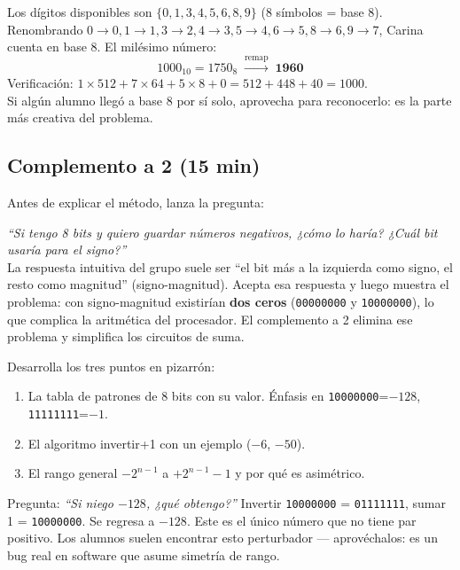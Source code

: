 \documentclass[12pt, oneside]{article}
\begin{document}
\begin{notaprofesor}
  Los dígitos disponibles son $\{0,1,3,4,5,6,8,9\}$ (8 símbolos = base 8).
  Renombrando $0\to0, 1\to1, 3\to2, 4\to3, 5\to4, 6\to5, 8\to6, 9\to7$,
  Carina cuenta en base 8. El milésimo número:
  \[
    1000_{10} = 1750_8 \;\xrightarrow{\text{remap}}\; \mathbf{1960}
  \]
  Verificación: $1\times512 + 7\times64 + 5\times8 + 0 = 512+448+40 = 1000$. \checkmark\\[4pt]
  Si algún alumno llegó a base 8 por sí solo, aprovecha para reconocerlo:
  es la parte más creativa del problema.
\end{notaprofesor}

\subsection{Complemento a 2 (15 min)}

Antes de explicar el método, lanza la pregunta:

\begin{notaprofesor}
  \textit{``Si tengo 8 bits y quiero guardar números negativos,
  ¿cómo lo haría? ¿Cuál bit usaría para el signo?''}\\[4pt]
  La respuesta intuitiva del grupo suele ser ``el bit más a la izquierda
  como signo, el resto como magnitud'' (signo-magnitud). Acepta esa
  respuesta y luego muestra el problema: con signo-magnitud existirían
  \textbf{dos ceros} (\texttt{00000000} y \texttt{10000000}), lo que
  complica la aritmética del procesador. El complemento a 2 elimina ese
  problema y simplifica los circuitos de suma.
\end{notaprofesor}

Desarrolla los tres puntos en pizarrón:
\begin{enumerate}
  \item La tabla de patrones de 8 bits con su valor.
        Énfasis en \texttt{10000000}=$-128$, \texttt{11111111}=$-1$.
  \item El algoritmo invertir+1 con un ejemplo ($-6$, $-50$).
  \item El rango general $-2^{n-1}$ a $+2^{n-1}-1$ y por qué es asimétrico.
\end{enumerate}

\begin{notaprofesor}
  Pregunta: \textit{``Si niego $-128$, ¿qué obtengo?''}
  Invertir \texttt{10000000} = \texttt{01111111}, sumar 1 = \texttt{10000000}.
  Se regresa a $-128$. Este es el único número que no tiene par positivo.
  Los alumnos suelen encontrar esto perturbador — aprovéchalos: es un
  bug real en software que asume simetría de rango.
\end{notaprofesor}
\end{document}
